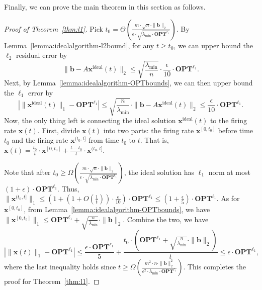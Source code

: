 \documentclass[11pt]{article}
\theoremstyle{remark}
\theoremstyle{definition}
\newcommand{\bx}{\mathbf{x}}
\newcommand{\bb}{\mathbf{b}}
\newcommand{\OPT}{\mathbf{OPT}}
\begin{document}
Finally, we can prove the main theorem in this section as follows.
\begin{proof}[Proof of Theorem~\ref{thm:l1}]
	Pick $t_0=\Theta(\frac{m\cdot\sqrt{n}\cdot\|\bb\|_2}{\epsilon\cdot\sqrt{\lambda_{\min}\cdot\OPT^{\ell_1}}})$. By Lemma~\ref{lemma:idealalgorithm-l2bound}, for any $t\geq t_0$, we can upper bound the $\ell_2$ residual error by
	$$\|\bb-A\bx^\text{ideal}(t)\|_2\leq\sqrt{\frac{\lambda_{\min}}{n}}\cdot\frac{\epsilon}{10}\cdot\OPT^{\ell_1}.$$
	Next, by Lemma~\ref{lemma:idealalgorithm-OPTbounds}, we can then upper bound the $\ell_1$ error by
	$$\left|\|\bx^\text{ideal}(t)\|_1-\OPT^{\ell_1}\right|\leq\sqrt{\frac{n}{\lambda_{\min}}}\cdot\|\bb-A\bx^\text{ideal}(t)\|_2\leq\frac{\epsilon}{10}\cdot\OPT^{\ell_1}.$$
	Now, the only thing left is connecting the ideal solution $\bx^\text{ideal}(t)$ to the firing rate $\bx(t)$. First, divide $\bx(t)$ into two parts: the firing rate $\bx^{[0,t_0]}$ before time $t_0$ and the firing rate $\bx^{(t_0,t]}$ from time $t_0$ to $t$. That is, $\bx(t) = \frac{t_0}{t}\cdot\bx^{[0,t_0]}+\frac{t-t_0}{t}\cdot\bx^{(t_0,t]}$.
	
	Note that after $t_0\geq\Omega(\frac{m\cdot\sqrt{n}\cdot\|\bb\|_2}{\epsilon\cdot\sqrt{\lambda_{\min}\cdot\OPT^{\ell_1}}})$, the ideal solution has $\ell_1$ norm at most $(1+\epsilon)\cdot\OPT^{\ell_1}$. Thus, $\|\bx^{(t_0,t]}\|_1\leq(1+(1+O(\frac{1}{t}))\cdot\frac{\epsilon}{10})\cdot\OPT^{\ell_1}\leq(1+\frac{\epsilon}{5})\cdot\OPT^{\ell_1}$.
	As for $\bx^{[0,t_0]}$, from Lemma~\ref{lemma:idealalgorithm-OPTbounds}, we have $\|\bx^{[0,t_0]}\|_1\leq\OPT^{\ell_1}+\sqrt{\frac{n}{\lambda_{\min}}}\cdot\|\bb\|_2$.
	Combine the two, we have
	$$
	\left|\|\bx(t)\|_1-\OPT^{\ell_1}\right|\leq\frac{\epsilon\cdot\OPT^{\ell_1}}{5} + \frac{t_0\cdot\left(\OPT^{\ell_1}+\sqrt{\frac{n}{\lambda_{\min}}}\cdot\|\bb\|_2\right)}{t}\leq\epsilon\cdot\OPT^{\ell_1},
	$$
	where the last inequality holds since $t\geq\Omega(\frac{m^2\cdot n\cdot\|\bb\|_2^2}{\epsilon^2\cdot\lambda_{\min}\cdot\OPT^{\ell_1}})$. This completes the proof for Theorem~\ref{thm:l1}.
\end{proof}


\end{document}
